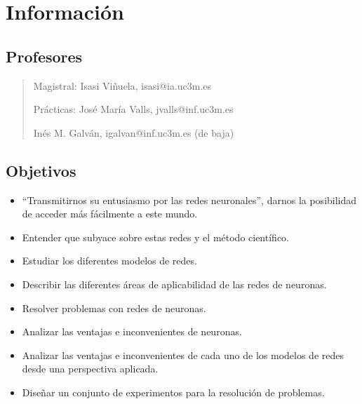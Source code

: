 \documentclass[12pt, twoside, openright]{report} %
\begin{document}
\listoffigures
\thispagestyle{fancy}

\listoftables
\thispagestyle{fancy}





\chapter{Información}

\section{Profesores}
\begin{quote}
	Magistral: Isasi Viñuela, isasi@ia.uc3m.es

	Prácticas: José María Valls, jvalls@inf.uc3m.es

	Inés M. Galván, igalvan@inf.uc3m.es (de baja)
\end{quote}

\section{Objetivos}
\begin{itemize}
	\item “Transmitirnos su entusiasmo por las redes neuronales”, darnos la posibilidad de acceder más fácilmente a este mundo.
	\item Entender que subyace sobre estas redes y el método científico.
	\item Estudiar los diferentes modelos de redes.
	\item Describir las diferentes áreas de aplicabilidad de las redes de neuronas.
	\item Resolver problemas con redes de neuronas.
	\item Analizar las ventajas e inconvenientes de neuronas.
	\item Analizar las ventajas e inconvenientes de cada uno de los modelos de redes desde una perspectiva aplicada.
	\item Diseñar un conjunto de experimentos para la resolución de problemas.
\end{itemize}
\end{document}
